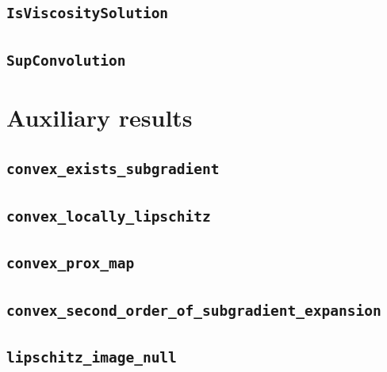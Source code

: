 \documentclass[11pt]{amsart}
\theoremstyle{definition}
\begin{document}
\subsection{\texorpdfstring{\texttt{IsViscositySolution}}{IsViscositySolution}}\label{node:IsViscositySolution}


\subsection{\texorpdfstring{\texttt{SupConvolution}}{SupConvolution}}\label{node:SupConvolution}


\section{Auxiliary results}
\subsection{\texorpdfstring{\texttt{convex\_exists\_subgradient}}{convex_exists_subgradient}}\label{node:convex_exists_subgradient}


\subsection{\texorpdfstring{\texttt{convex\_locally\_lipschitz}}{convex_locally_lipschitz}}\label{node:convex_locally_lipschitz}


\subsection{\texorpdfstring{\texttt{convex\_prox\_map}}{convex_prox_map}}\label{node:convex_prox_map}


\subsection{\texorpdfstring{\texttt{convex\_second\_order\_of\_subgradient\_expansion}}{convex_second_order_of_subgradient_expansion}}\label{node:convex_second_order_of_subgradient_expansion}


\subsection{\texorpdfstring{\texttt{lipschitz\_image\_null}}{lipschitz_image_null}}\label{node:lipschitz_image_null}

\end{document}
